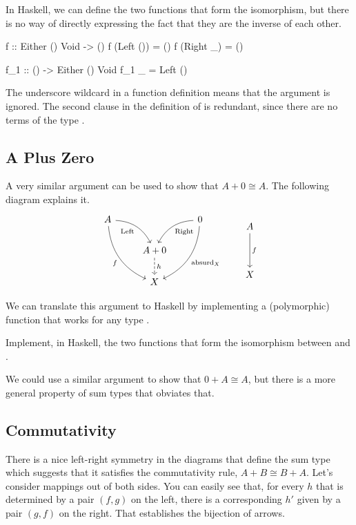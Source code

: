 \documentclass[DaoFP]{subfiles}
\begin{document}
In Haskell, we can define the two functions that form the isomorphism, but there is no way of directly expressing the fact that they are the inverse of each other.
\begin{haskell}
f :: Either () Void -> ()
f (Left ()) = ()
f (Right _) = ()

f_1 :: () -> Either () Void
f_1 _ = Left ()
\end{haskell}
The underscore wildcard in a function definition means that the argument is ignored. The second clause in the definition of  is redundant, since there are no terms of the type . 

\subsection{A Plus Zero}
A very similar argument can be used to show that $A + 0 \cong A$. The following diagram explains it.
\[
 \begin{tikzcd}
 A
 \arrow[dr,  bend left, "\text{Left}"']
 \arrow[ddr, bend right, "f"']
 && 0
 \arrow[dl, bend right, "\text{Right}"]
 \arrow[ddl, bend left, "\text{absurd}_X"]
 \\
&A + 0
\arrow[d, dashed, "h"]
\\
& X
 \end{tikzcd}
 \qquad
 \begin{tikzcd}
 A
 \arrow[dd, "f"]
 \\
 \\
 X
 \end{tikzcd}
\]

We can translate this argument to Haskell by implementing a (polymorphic) function  that works for any type . 

\begin{exercise}
Implement, in Haskell, the two functions that form the isomorphism between  and .
\end{exercise}

We could use a similar argument to show that $0 + A \cong A$, but there is a more general property of sum types that obviates that.

\subsection{Commutativity}

There is a nice left-right symmetry in the diagrams that define the sum type which suggests that it satisfies the commutativity rule, $A + B \cong B + A$. Let's consider mappings out of both sides. You can easily see that, for every $h$ that is determined by a pair $(f, g)$ on the left, there is a corresponding $h'$ given by a pair $(g, f)$ on the right. That establishes the bijection of arrows.
\end{document}
